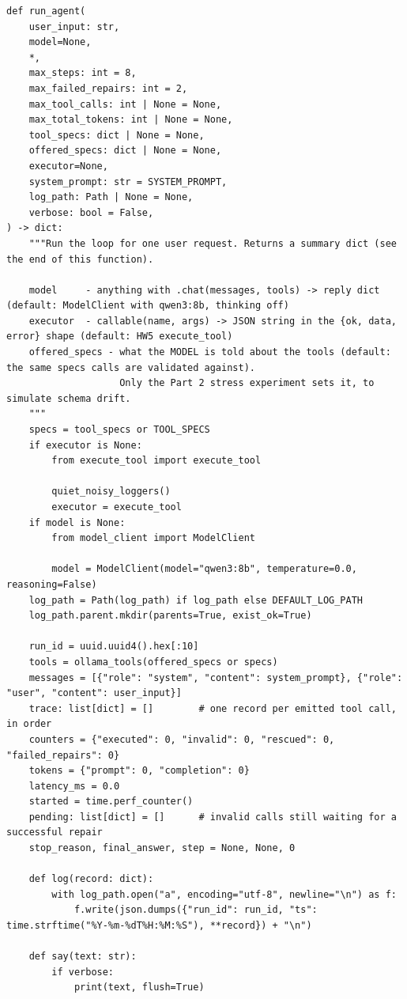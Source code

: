 \documentclass[11pt]{article}
\begin{document}
\begingroup\lstset{basicstyle=\ttfamily\tiny}
\begin{lstlisting}
def run_agent(
    user_input: str,
    model=None,
    *,
    max_steps: int = 8,
    max_failed_repairs: int = 2,
    max_tool_calls: int | None = None,
    max_total_tokens: int | None = None,
    tool_specs: dict | None = None,
    offered_specs: dict | None = None,
    executor=None,
    system_prompt: str = SYSTEM_PROMPT,
    log_path: Path | None = None,
    verbose: bool = False,
) -> dict:
    """Run the loop for one user request. Returns a summary dict (see the end of this function).

    model     - anything with .chat(messages, tools) -> reply dict (default: ModelClient with qwen3:8b, thinking off)
    executor  - callable(name, args) -> JSON string in the {ok, data, error} shape (default: HW5 execute_tool)
    offered_specs - what the MODEL is told about the tools (default: the same specs calls are validated against).
                    Only the Part 2 stress experiment sets it, to simulate schema drift.
    """
    specs = tool_specs or TOOL_SPECS
    if executor is None:
        from execute_tool import execute_tool

        quiet_noisy_loggers()
        executor = execute_tool
    if model is None:
        from model_client import ModelClient

        model = ModelClient(model="qwen3:8b", temperature=0.0, reasoning=False)
    log_path = Path(log_path) if log_path else DEFAULT_LOG_PATH
    log_path.parent.mkdir(parents=True, exist_ok=True)

    run_id = uuid.uuid4().hex[:10]
    tools = ollama_tools(offered_specs or specs)
    messages = [{"role": "system", "content": system_prompt}, {"role": "user", "content": user_input}]
    trace: list[dict] = []        # one record per emitted tool call, in order
    counters = {"executed": 0, "invalid": 0, "rescued": 0, "failed_repairs": 0}
    tokens = {"prompt": 0, "completion": 0}
    latency_ms = 0.0
    started = time.perf_counter()
    pending: list[dict] = []      # invalid calls still waiting for a successful repair
    stop_reason, final_answer, step = None, None, 0

    def log(record: dict):
        with log_path.open("a", encoding="utf-8", newline="\n") as f:
            f.write(json.dumps({"run_id": run_id, "ts": time.strftime("%Y-%m-%dT%H:%M:%S"), **record}) + "\n")

    def say(text: str):
        if verbose:
            print(text, flush=True)


\end{lstlisting}
\end{document}
